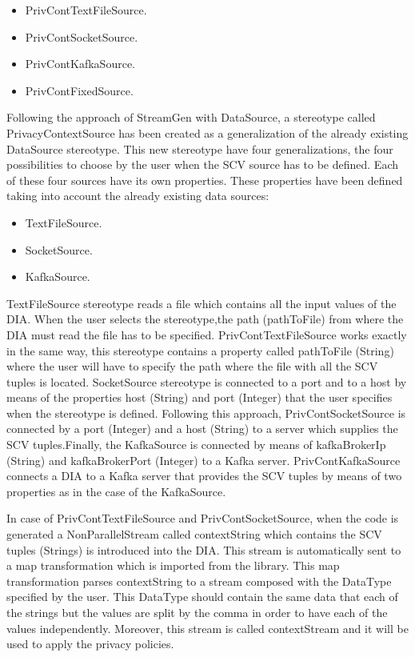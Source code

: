 \begin{itemize}
\item PrivContTextFileSource.
\item PrivContSocketSource.
\item PrivContKafkaSource.
\item PrivContFixedSource.
\end{itemize}

Following the approach of StreamGen with DataSource, a stereotype called PrivacyContextSource has been created as a generalization of the already existing DataSource stereotype. This new stereotype have four generalizations, the four possibilities to choose by the user when the SCV source has to be defined. Each of these four sources have its own properties. These properties have been defined taking into account the already existing data sources:

\begin{itemize}
\item TextFileSource.
\item SocketSource.
\item KafkaSource.
\end{itemize}

TextFileSource stereotype reads a file which contains all the input values of the DIA. When the user selects the stereotype,the path (pathToFile) from where the DIA must read the file has to be specified. PrivContTextFileSource works exactly in the same way, this stereotype contains a property called pathToFile (String) where the user will have to specify the path where the file with all the SCV tuples is located. SocketSource stereotype is connected to a port and to a host by means of the properties host (String) and port (Integer) that the user specifies when the stereotype is defined. Following this approach, PrivContSocketSource is connected by a port (Integer) and a host (String) to a server which supplies the SCV tuples.Finally, the KafkaSource is connected by means of kafkaBrokerIp (String) and kafkaBrokerPort (Integer) to a Kafka server. PrivContKafkaSource connects a DIA to a Kafka server that provides the SCV tuples by means of two properties as in the case of the KafkaSource.

In case of PrivContTextFileSource and PrivContSocketSource, when the code is generated a NonParallelStream called contextString which contains the SCV tuples (Strings) is introduced into the DIA. This stream is automatically sent to a map transformation which is imported from the library. This map transformation parses contextString to a stream composed with the DataType specified by the user. This DataType should contain the same data that each of the strings but the values are split by the comma in order to have each of the values independently. Moreover, this stream is called contextStream and it will be used to apply the privacy policies.

